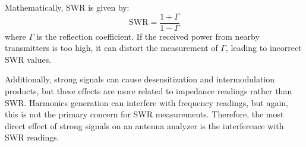 Mathematically, SWR is given by:
\[
\text{SWR} = \frac{1 + \Gamma}{1 - \Gamma}
\]
where \(\Gamma\) is the reflection coefficient. If the received power from nearby transmitters is too high, it can distort the measurement of \(\Gamma\), leading to incorrect SWR values.

Additionally, strong signals can cause desensitization and intermodulation products, but these effects are more related to impedance readings rather than SWR. Harmonics generation can interfere with frequency readings, but again, this is not the primary concern for SWR measurements. Therefore, the most direct effect of strong signals on an antenna analyzer is the interference with SWR readings.

